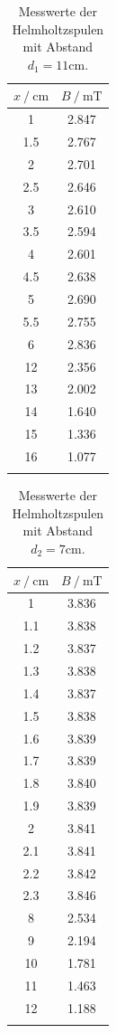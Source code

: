 \FloatBarrier
\begin{table}
\centering
\caption{Messwerte der Helmholtzspulen mit Abstand $d_1=11\si{\centi\meter}$.}
\begin{tabular}{cc}
\toprule
$x \:/\: \si{\centi\meter}$ & $B \:/\: \si{\milli\tesla}$ \\
\midrule
1 & 2.847 \\
1.5& 2.767\\
2& 2.701\\
2.5& 2.646\\
3& 2.610\\
3.5& 2.594\\
4& 2.601\\
4.5& 2.638\\
5& 2.690\\
5.5& 2.755\\
6& 2.836\\
12& 2.356\\
13& 2.002\\
14& 1.640\\
15& 1.336\\
16& 1.077\\
\bottomrule
\label{tab:helm1}
\end{tabular}
\end{table}

\begin{table}
\centering
\caption{Messwerte der Helmholtzspulen mit Abstand $d_2=7\si{\centi\metre}$.}
\begin{tabular}{cc}
\toprule
$x \:/\: \si{\centi\metre}$ & $B \:/\: \si{\milli\tesla}$ \\
\midrule
1& 3.836  \\
1.1& 3.838\\
1.2& 3.837\\
1.3& 3.838\\
1.4& 3.837\\
1.5& 3.838\\
1.6& 3.839\\
1.7& 3.839\\
1.8& 3.840\\
1.9& 3.839\\
2& 3.841\\
2.1& 3.841\\
2.2& 3.842\\
2.3& 3.846\\
8& 2.534\\
9& 2.194\\
10& 1.781\\
11& 1.463\\
12& 1.188\\
\bottomrule
\label{tab:helm2}
\end{tabular}
\end{table}



